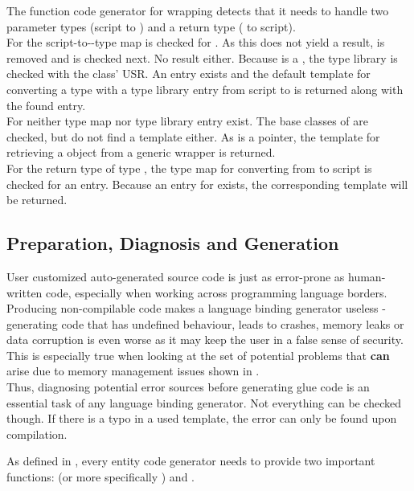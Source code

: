The function code generator for wrapping  detects that it needs to handle two parameter types (script to ) and a return type ( to script).\\
For  the script-to--type map is checked for . As this does not yield a result,  is removed and  is checked next. No result either. Because  is a , the type library is checked with the class' USR. An entry exists and the default template for converting a type with a type library entry from script to  is returned along with the found entry.\\
For  neither type map nor type library entry exist. The base classes of  are checked, but do not find a template either. As  is a pointer, the template for retrieving a  object from a generic wrapper is returned.\\
For the return type of type , the type map for converting from  to script is checked for an entry. Because an entry for  exists, the corresponding template will be returned.

\subsection{Preparation, Diagnosis and Generation}

User customized auto-generated source code is just as error-prone as human-written code, especially when working across programming language borders. Producing \linebreak non-compilable code makes a language binding generator useless - generating code that has undefined behaviour, leads to crashes, memory leaks or data corruption is even worse as it may keep the user in a false sense of security. This is especially true when looking at the set of potential problems that \textbf{can} arise due to memory management issues shown in .\\
Thus, diagnosing potential error sources before generating glue code is an essential task of any language binding generator. Not everything can be checked though. If there is a typo in a used template, the error can only be found upon compilation.

As defined in , every entity code generator needs to \linebreak provide two important functions:  (or more specifically \linebreak{}) and .

